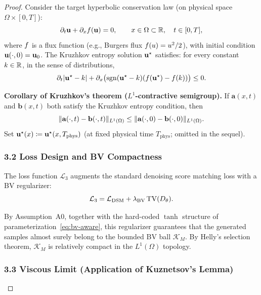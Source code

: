 \begin{proof}
Consider the target hyperbolic conservation law (on physical space $\Omega \times [0,T]$):
\begin{equation}
  \partial_t \mathbf{u} + \partial_x f(\mathbf{u}) = 0, \qquad x \in \Omega \subset \mathbb{R}, \quad t \in [0,T],
\end{equation}
where $f$ is a flux function (e.g., Burgers flux $f(u) = u^2/2$), with initial condition $\mathbf{u}(\cdot,0) = \mathbf{u}_{0}$.
The Kruzhkov entropy solution $\mathbf{u}^{\star}$ satisfies: for every constant $k \in \mathbb{R}$, in the sense of distributions,
\begin{equation}
  \partial_t |\mathbf{u}^{\star} - k| + \partial_x \bigl(\mathrm{sgn}(\mathbf{u}^{\star} - k)(f(\mathbf{u}^{\star}) - f(k))\bigr) \leq 0.
\end{equation}

\textbf{Corollary of Kruzhkov's theorem ($L^1$-contractive semigroup).}
If $\mathbf{a}(x,t)$ and $\mathbf{b}(x,t)$ both satisfy the Kruzhkov entropy condition, then
\begin{equation}
  \lVert \mathbf{a}(\cdot,t) - \mathbf{b}(\cdot,t) \rVert_{L^1(\Omega)} \leq \lVert \mathbf{a}(\cdot,0) - \mathbf{b}(\cdot,0) \rVert_{L^1(\Omega)}.
\end{equation}
Set $\mathbf{u}^{\star}(x) \coloneqq \mathbf{u}^{\star}(x, T_{\mathrm{phys}})$ (at fixed physical time $T_{\mathrm{phys}}$; omitted in the sequel).

\subsubsection{3.2 Loss Design and BV Compactness}

The loss function $\mathcal{L}_3$ augments the standard denoising score matching loss with a BV regularizer:
\begin{equation}
  \mathcal{L}_3 = \mathcal{L}_{\mathrm{DSM}} + \lambda_{\mathrm{BV}} \, \mathrm{TV}(D_{\theta}).
\end{equation}

By Assumption~A0, together with the hard-coded $\tanh$ structure of parameterization~\eqref{eq:bv-aware}, this regularizer guarantees that the generated samples almost surely belong to the bounded BV ball $\mathcal{K}_M$.
By Helly's selection theorem, $\mathcal{K}_M$ is relatively compact in the $L^1(\Omega)$ topology.

\subsubsection{3.3 Viscous Limit (Application of Kuznetsov's Lemma)}


\end{proof}
